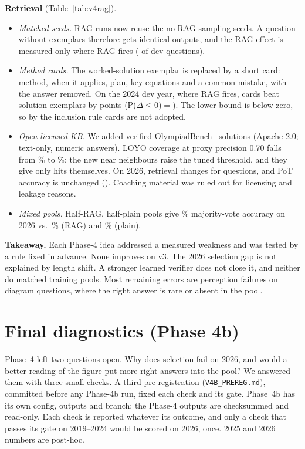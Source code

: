 \documentclass[conference]{IEEEtran}
\begin{document}
\textbf{Retrieval} (Table~\ref{tab:v4rag}).
\begin{itemize}
\item \emph{Matched seeds.} RAG runs now reuse the no-RAG sampling seeds. A question without
exemplars therefore gets identical outputs, and the RAG effect is measured only where RAG fires
(\VfFired{} of \VfDevQ{} dev questions).
\item \emph{Method cards.} The worked-solution exemplar is replaced by a short card: method, when
it applies, plan, key equations and a common mistake, with the answer removed. On the 2024 dev
year, where RAG fires, cards beat solution exemplars by \VfCardSol{} points
(P($\Delta{\le}0$)${=}$\VfCardSolP). The lower bound is below zero, so by the inclusion rule cards
are not adopted.
\item \emph{Open-licensed KB.} We added \VfOlyEntries{} verified OlympiadBench~\cite{olympiadbench}
solutions (Apache-2.0; text-only, numeric answers). LOYO coverage at proxy precision 0.70 falls
from \VfCovThree\% to \VfCovFour\%: the new near neighbours raise the tuned threshold, and they
give only \VfOlyHits{} hits themselves. On 2026, retrieval changes for \VfKbChanged{} questions,
and PoT accuracy is unchanged (\VfKbAll). Coaching material was ruled out for licensing and
leakage reasons.
\item \emph{Mixed pools.} Half-RAG, half-plain pools give \VfMixed\% majority-vote accuracy on
2026 vs.\ \VfMixRag\% (RAG) and \VfMixPot\% (plain).
\end{itemize}

\textbf{Takeaway.} Each Phase-4 idea addressed a measured weakness and was tested by a rule fixed
in advance. None improves on v3. The 2026 selection gap is not explained by length shift. A
stronger learned verifier does not close it, and neither do matched training pools. Most
remaining errors are perception failures on diagram questions, where the right answer is rare or
absent in the pool.

\section{Final diagnostics (Phase 4b)}\label{sec:v4b}
Phase~4 left two questions open. Why does selection fail on 2026, and would a better reading of
the figure put more right answers into the pool? We answered them with three small checks. A
third pre-registration (\texttt{V4B\_PREREG.md}), committed before any Phase-4b run, fixed each
check and its gate. Phase~4b has its own config, outputs and branch; the Phase-4 outputs are
checksummed and read-only. Each check is reported whatever its outcome, and only a check that
passes its gate on 2019--2024 would be scored on 2026, once. 2025 and 2026 numbers are post-hoc.
\end{document}
